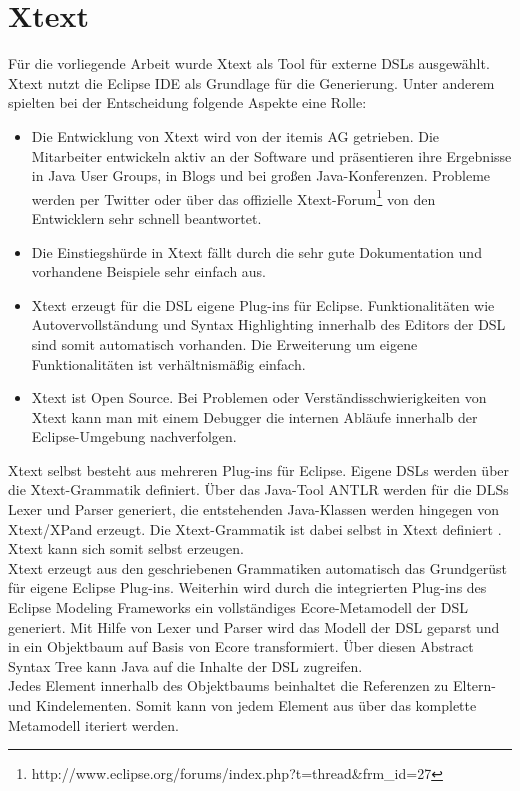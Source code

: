 \documentclass[a4paper,12pt]{scrreprt}
\begin{document}
\section{Xtext}
Für die vorliegende Arbeit wurde Xtext als Tool für externe DSLs ausgewählt. Xtext nutzt die Eclipse IDE als Grundlage für die Generierung. Unter anderem spielten bei der Entscheidung folgende Aspekte eine Rolle:
\begin{itemize}
	\item Die Entwicklung von Xtext wird von der itemis AG getrieben. Die Mitarbeiter entwickeln aktiv an der Software und präsentieren ihre Ergebnisse in Java User Groups, in Blogs und bei großen Java-Konferenzen. Probleme werden per Twitter oder über das offizielle Xtext-Forum\footnote{http://www.eclipse.org/forums/index.php?t=thread\&frm\_id=27} von den Entwicklern sehr schnell beantwortet.
	\item Die Einstiegshürde in Xtext fällt durch die sehr gute Dokumentation und vorhandene Beispiele sehr einfach aus.
	\item Xtext erzeugt für die DSL eigene Plug-ins für Eclipse. Funktionalitäten wie Autovervollständung und Syntax Highlighting innerhalb des Editors der DSL sind somit automatisch vorhanden. Die Erweiterung um eigene Funktionalitäten ist verhältnismäßig einfach.
	\item Xtext ist Open Source. Bei Problemen oder Verständisschwierigkeiten von Xtext kann man mit einem Debugger die internen Abläufe innerhalb der Eclipse-Umgebung nachverfolgen.
\end{itemize} 

Xtext selbst besteht aus mehreren Plug-ins für Eclipse. Eigene DSLs werden über die Xtext-Grammatik definiert. 
Über das Java-Tool ANTLR werden für die DLSs Lexer und Parser generiert, die entstehenden Java-Klassen werden hingegen von Xtext/XPand erzeugt. 
Die Xtext-Grammatik ist dabei selbst in Xtext definiert \cite{xtextXtext}. Xtext kann sich somit selbst erzeugen.
\\
Xtext erzeugt aus den geschriebenen Grammatiken automatisch das Grundgerüst für eigene Eclipse Plug-ins. Weiterhin wird durch die integrierten Plug-ins des Eclipse Modeling Frameworks ein vollständiges Ecore-Metamodell der DSL generiert.
Mit Hilfe von Lexer und Parser wird das Modell der DSL geparst und in ein Objektbaum auf Basis von Ecore transformiert. Über diesen Abstract Syntax Tree kann Java auf die Inhalte der DSL zugreifen.\\
Jedes Element innerhalb des Objektbaums beinhaltet die Referenzen zu Eltern- und Kindelementen. Somit kann von jedem Element aus über das komplette Metamodell iteriert werden.
\end{document}
